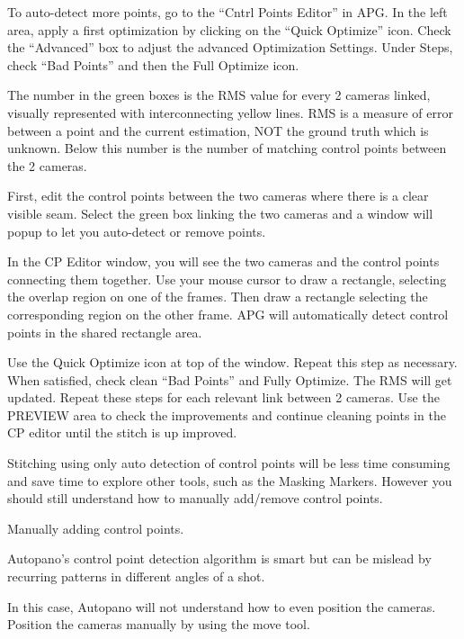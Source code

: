 \begin{fullwidth}

To auto-detect more points, go to the “Cntrl Points Editor” in APG. In the left area, apply a first optimization by clicking on the “Quick Optimize” icon. Check the “Advanced” box to adjust the advanced Optimization Settings. Under Steps, check “Bad Points” and then the Full Optimize icon.


The number in the green boxes is the RMS value for every 2 cameras linked, visually represented with interconnecting yellow lines. RMS is a measure of error between a point and the current estimation, NOT the ground truth which is unknown. Below this number is the number of matching control points between the 2 cameras.


First, edit the control points between the two cameras where there is a clear visible seam. Select the green box linking the two cameras and a window will popup to let you auto-detect or remove points.

In the CP Editor window, you will see the two cameras and the control points connecting them together. Use your mouse cursor to draw a rectangle, selecting the overlap region on one of the frames. Then draw a rectangle selecting the corresponding region on the other frame. APG will automatically detect control points in the shared rectangle area. 


Use the Quick Optimize icon at top of the window. Repeat this step as necessary. When satisfied, check clean “Bad Points” and Fully Optimize. The RMS will get updated. Repeat these steps for each relevant link between 2 cameras. Use the PREVIEW area to check the improvements and continue cleaning points in the CP editor until the stitch is up improved.

Stitching using only auto detection of control points will be less time consuming and save time to explore other tools, such as the Masking Markers. However you should still understand how to manually add/remove control points. 

\clearpage
{\large Manually adding control points. \par}

Autopano’s control point detection algorithm is smart but can be mislead by recurring patterns in different angles of a shot. 

In this case, Autopano will not understand how to even position the cameras. Position the cameras manually by using the move tool. 


\end{fullwidth}

